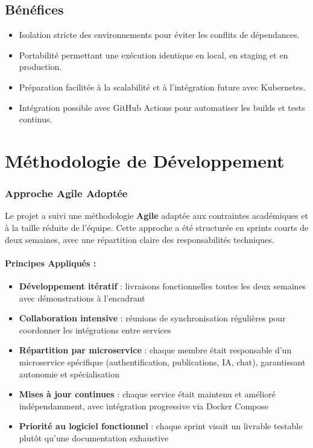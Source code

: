 \documentclass[12pt]{rapportPfe}
\begin{document}
\subsection{Bénéfices}

\begin{itemize}
    \item Isolation stricte des environnements pour éviter les conflits de dépendances.
    \item Portabilité permettant une exécution identique en local, en staging et en production.
    \item Préparation facilitée à la scalabilité et à l’intégration future avec Kubernetes.
    \item Intégration possible avec GitHub Actions pour automatiser les builds et tests continus.
\end{itemize}

\section{Méthodologie de Développement}
\subsubsection{Approche Agile Adoptée}
Le projet a suivi une méthodologie \textbf{Agile} adaptée aux contraintes académiques et à la taille réduite de l'équipe. Cette approche a été structurée en sprints courts de deux semaines, avec une répartition claire des responsabilités techniques.

\paragraph{Principes Appliqués :}
\begin{itemize}
    \item \textbf{Développement itératif} : livraisons fonctionnelles toutes les deux semaines avec démonstrations à l'encadrant
    \item \textbf{Collaboration intensive} : réunions de synchronisation régulières pour coordonner les intégrations entre services
    \item \textbf{Répartition par microservice} : chaque membre était responsable d’un microservice spécifique (authentification, publications, IA, chat), garantissant autonomie et spécialisation
    \item \textbf{Mises à jour continues} : chaque service était maintenu et amélioré indépendamment, avec intégration progressive via Docker Compose
    \item \textbf{Priorité au logiciel fonctionnel} : chaque sprint visait un livrable testable plutôt qu'une documentation exhaustive
\end{itemize}
\end{document}
